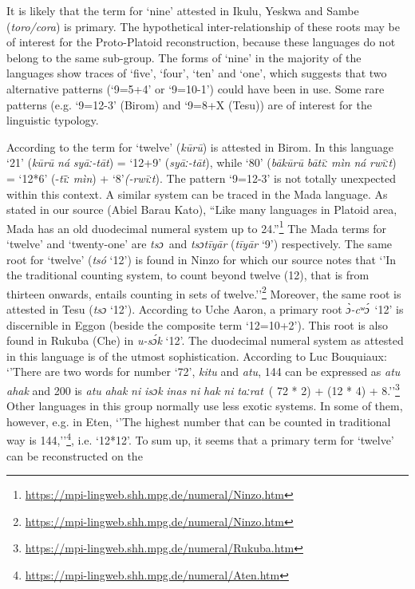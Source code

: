 \clearpage 
It is likely that the term for ‘nine’ attested in Ikulu, Yeskwa and Sambe (\textit{toro/cora}) is primary. The hypothetical inter-relationship of these roots may be of interest for the Proto-Platoid reconstruction, because these languages do not belong to the same sub-group. The forms of ‘nine’ in the majority of the languages show traces of ‘five’, ‘four’, ‘ten’ and ‘one’, which suggests that two alternative patterns (‘9=5+4’ or ‘9=10-1’) could have been in use. Some rare patterns (e.g. ‘9=12-3’ (Birom) and ‘9=8+X (Tesu)) are of interest for the linguistic typology.

According to \citet{Bouquiaux1962} the term for ‘twelve’ (\textit{k{\={u}}r{\={u}}}) is attested in Birom.  In this language ‘21’ (\textit{k{\={u}}r{\={u}}} \textit{ná} \textit{syāː-tāt}) = ‘12+9’ (\textit{syāː-tāt}), while ‘80’ (\textit{bāk{\={u}}r{\={u}}} \textit{bātīː} \textit{mìn} \textit{ná} \textit{rwīːt}) = ‘12*6’ (-\textit{t{\=ī}ː} \textit{mìn}) + ‘8’\textit{(-rwīːt}). The pattern ‘9=12-3’ is not totally unexpected within this context. A similar system can be traced in the Mada language. As stated in our source (Abiel Barau Kato), “Like many languages in Platoid area, Mada has an old duodecimal numeral system up to 24.”\footnote{\href{https://mpi-lingweb.shh.mpg.de/numeral/Ninzo.htm}{https://mpi-lingweb.shh.mpg.de/numeral/Ninzo}\href{https://mpi-lingweb.shh.mpg.de/numeral/Ninzo.htm}{.htm}} The Mada terms for ‘twelve’ and ‘twenty-one’ are \textit{tsɔ}~and \textit{tsɔtīyār} (\textit{tīyār} ‘9’) respectively. The same root for ‘twelve’ (\textit{tsó} ‘12’) is found in Ninzo for which our source notes that ‘’In the traditional counting system, to count beyond twelve (12), that is from thirteen onwards, entails counting in sets of twelve.’’\footnote{\href{https://mpi-lingweb.shh.mpg.de/numeral/Ninzo.htm}{https://mpi-lingweb.shh.mpg.de/numeral/Ninzo}\href{https://mpi-lingweb.shh.mpg.de/numeral/Ninzo.htm}{.htm}} Moreover, the same root is attested in Tesu (\textit{tsɔ} ‘12’). According to Uche Aaron, a primary root \textit{{\`{ɔ}}-cʷ{\'{ɔ}}}~‘12’ is discernible in Eggon (beside the composite term ‘12=10+2’). This root is also found in Rukuba (Che) in \textit{u-s{\'{ɔ}}k} ‘12’. The duodecimal numeral system as attested in this language is of the utmost sophistication. According to Luc Bouquiaux: ‘’There are two words for number `72', \textit{kitu} and \textit{atu}, 144 can be expressed as \textit{atu} \textit{ahak} and 200 is \textit{atu} \textit{ahak} \textit{ni} \textit{isɔk} \textit{inas} \textit{ni} \textit{hak} \textit{ni} \textit{taːrat}~( 72 * 2) + (12 * 4) + 8.’’\footnote{\href{https://mpi-lingweb.shh.mpg.de/numeral/Rukuba.htm}{https://mpi-lingweb.shh.mpg.de/numeral/Rukuba}\href{https://mpi-lingweb.shh.mpg.de/numeral/Rukuba.htm}{.htm}} Other languages in this group normally use less exotic systems. In some of them, however, e.g. in Eten, ‘’The highest number that can be counted in traditional way is 144,’’\footnote{\url{https://mpi-lingweb.shh.mpg.de/numeral/Aten.htm}}, i.e. ‘12*12’. To sum up, it seems that a primary term for ‘twelve’ can be reconstructed on the 